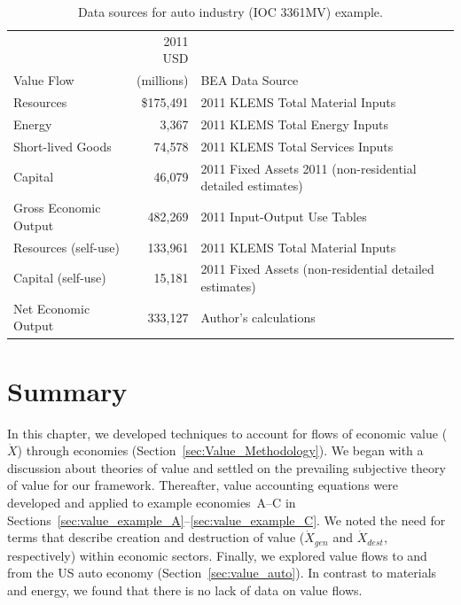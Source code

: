 \begin{table}
\caption[Data Sources for auto industry (IOC 3361MV) example]{Data sources for auto industry (IOC 3361MV) example.}
\begin{center}
  \begin{tabular}{l r @{\hspace{2em}} l}
   \toprule 
     & 2011 USD &   \\ 
Value Flow & (millions) & BEA\index{Bureau of Economic Analysis} Data Source \\
	\midrule
    Resources  & \$175,491           & 2011 KLEMS Total Material Inputs \\

   Energy &   3,367&   2011 KLEMS Total Energy Inputs                \\

    Short-lived Goods &   74,578 &   2011 KLEMS Total Services Inputs    \\
    Capital &  46,079  &  2011 Fixed Assets 2011 (non-residential detailed estimates)     \\  

    Gross Economic Output & 482,269  &   2011 Input-Output Use Tables \\

    Resources (self-use)  &  133,961 & 2011 KLEMS Total Material Inputs     \\
    Capital (self-use) & 15,181 & 2011 Fixed Assets (non-residential detailed estimates)      \\
    Net Economic Output & 333,127   &  Author's calculations \\
    \bottomrule
  \end{tabular}

\end{center}
\label{tab:data}
\end{table}


\section{Summary}
\label{sec:value_summary}

In this chapter, we developed techniques to account for flows of economic value
($\dot{X}$) through economies 
(Section~\ref{sec:Value_Methodology}).
We began with a discussion about theories of value and settled on
the prevailing subjective theory of value for our framework.
Thereafter, value accounting equations were developed and applied to example
economies~A--C %
in Sections~\ref{sec:value_example_A}--\ref{sec:value_example_C}. 
We noted the need for terms that describe creation and destruction
of value ($\dot{X}_{gen}$ and $\dot{X}_{dest}$, respectively) 
within economic sectors.
Finally, we explored value flows 
to and from the US auto economy (Section~\ref{sec:value_auto}).
In contrast to materials and energy,
we found that there is no lack of data on value flows.

